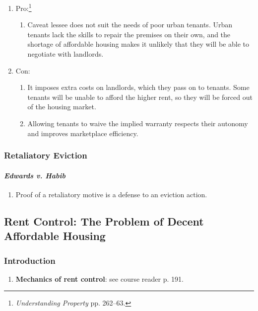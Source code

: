 \begin{enumerate}
    \item Pro:\footnote{\emph{Understanding Property} pp. 262--63.}
    \begin{enumerate}
        \item Caveat lessee does not suit the needs of poor urban tenants. 
        Urban tenants lack the skills to repair the premises on their own, and 
        the shortage of affordable housing makes it unlikely that they will be 
        able to negotiate with landlords.
    \end{enumerate}
    \item Con:
    \begin{enumerate}
        \item It imposes extra costs on landlords, which they pass on to 
        tenants. Some tenants will be unable to afford the higher rent, so 
        they will be forced out of the housing market.
        \item Allowing tenants to waive the implied warranty respects their 
        autonomy and improves marketplace efficiency.
    \end{enumerate}
\end{enumerate}

\subsubsection{Retaliatory Eviction}

\paragraph{\emph{Edwards v. Habib}}

\begin{enumerate}
    \item Proof of a retaliatory motive is a defense to an eviction action.
\end{enumerate}

\subsection{Rent Control: The Problem of Decent Affordable Housing} 

\subsubsection{Introduction}

\begin{enumerate}
    \item \textbf{Mechanics of rent control}: see course reader p. 191.
\end{enumerate}

